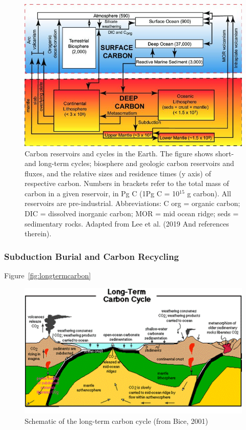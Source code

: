\documentclass{book}\usepackage{knitr}
\begin{document}
\begin{figure}
\includegraphics[width=\linewidth]{images/earth-system/Carbon-reservoirs-and-cycles-in-the-Earth.jpg}
\caption{Carbon reservoirs and cycles in the Earth. The figure shows short-and long-term cycles; biosphere and geologic carbon reservoirs and fluxes, and the relative sizes and residence times (y axis) of respective carbon. Numbers in brackets refer to the total mass of carbon in a given reservoir, in Pg C (1Pg C = 10$^{15}$ g carbon). All reservoirs are pre-industrial. Abbreviations: C org = organic carbon; DIC = dissolved inorganic carbon; MOR = mid ocean ridge; seds = sedimentary rocks. Adapted from Lee et al. (2019 And references therein).}
\label{fig:carbonpools}
\end{figure}

\subsubsection{Subduction Burial and Carbon Recycling}

Figure~\ref{fig:longtermcarbon}

\begin{figure}
\includegraphics[width=\linewidth]{images/earth-system/long-term-carbon.png}
\caption{Schematic of the long-term carbon cycle (from Bice, 2001)}
\label{longtermcarbon}
\end{figure}
\end{document}
